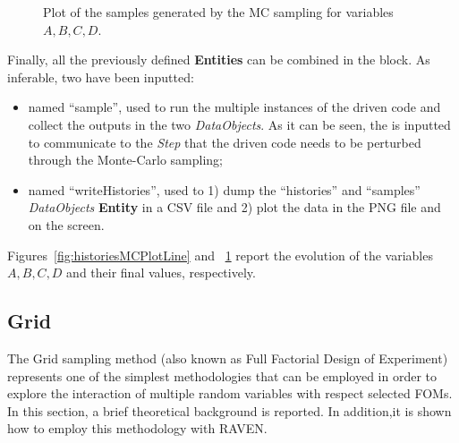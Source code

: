 \begin{enumerate}
\begin{figure}[h!]
  \caption{Plot of the samples generated by the MC sampling for variables $A,B,C,D$.}
  \label{fig:samplesMCPlotLine}
 \end{figure}
   Finally, all the previously defined \textbf{Entities} can be combined in 
   the  block. As inferable, 
   two  have been inputted:
   \begin{itemize}
     \item {} named ``sample'', used to run the multiple  
     instances of the driven code and 
     collect the outputs in the two \textit{DataObjects}. As it can be
     seen, the  is inputted to communicate to the 
     \textit{Step} that the driven code needs to
     be perturbed through the Monte-Carlo sampling;
     \item  {} named ``writeHistories'', used to 1) dump 
     the ``histories'' and ``samples'' \textit{DataObjects} 
     \textbf{Entity} in a CSV file and 2) plot the data in the PNG file and 
     on the screen.
   \end{itemize}
\end{enumerate} 
 Figures~\ref{fig:historiesMCPlotLine} and ~\ref{fig:samplesMCPlotLine}  report the evolution of the 
 variables $A,B,C,D$ and their final values, respectively.
\subsection{Grid}
\label{sub:Grid}
The Grid sampling method (also known as Full Factorial Design of Experiment) represents one of the simplest methodologies that can be employed in order to explore the interaction of multiple random variables with respect
selected FOMs.
In this section, a brief theoretical 
background is reported. In addition,it is shown how to employ this methodology with RAVEN.
